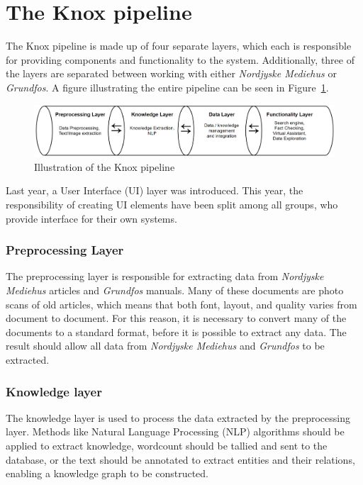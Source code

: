 \section{The Knox pipeline}\label{the_knox_pipeline}


The Knox pipeline is made up of four separate layers, which each is responsible for providing components and functionality to the system.
 Additionally, three of the layers are separated between working with either \textit{Nordjyske Mediehus} or \textit{Grundfos}.
  A figure illustrating the entire pipeline can be seen in Figure\ \ref{fig:pipeline}.

\begin{figure}[H]
    \centering
    \includegraphics[width=1\textwidth]{Images/Pipeline.PNG}
    \caption{Illustration of the Knox pipeline\label{fig:pipeline}}
\end{figure}

Last year, a User Interface (UI) layer was introduced. This year, the responsibility of creating UI elements have been split among all groups, who provide interface for their own systems.

\subsubsection{Preprocessing Layer}
The preprocessing layer is responsible for extracting data from \textit{Nordjyske Mediehus} articles and \textit{Grundfos} manuals. Many of these documents are photo scans of old articles, which means that both font, layout, and quality varies from document to document. For this reason, it is necessary to convert many of the documents to a standard format, before it is possible to extract any data. The result should allow all data from \textit{Nordjyske Mediehus} and \textit{Grundfos} to be extracted. 

\subsubsection{Knowledge layer}
The knowledge layer is used to process the data extracted by the preprocessing layer. Methods like Natural Language Processing (NLP) algorithms should be applied to extract knowledge, wordcount should be tallied and sent to the database, or the text should be annotated to extract entities and their relations, enabling a knowledge graph to be constructed.

